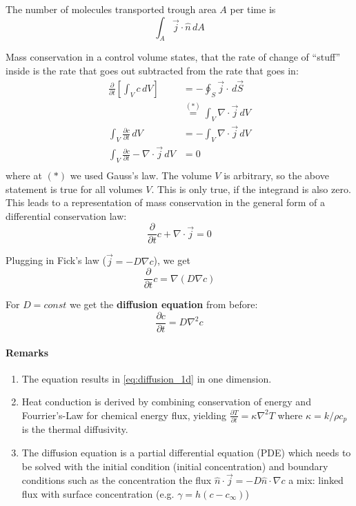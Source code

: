 The number of molecules transported trough area $A$ per time is
\begin{equation*}
	\int_A \vec j \cdot \hat n \, dA
\end{equation*}


Mass conservation in a control volume states, that the rate of change of \enquote{stuff} inside is the rate that goes out subtracted from the rate that goes in:
\begin{equation*}
	\begin{split}
	\frac \partial {\partial t}\left[\int_V c\,dV\right] &= -\oint_S \vec j \cdot \,d\vec S\\
	&\stackrel{(*)}{=} \int_V \nabla \cdot \vec j \,dV\\
	\int_V\frac{\partial c}{\partial t}\,dV &= -\int_V \nabla \cdot \vec j \,dV\\
	\int_V\frac{\partial c}{\partial t}- \nabla \cdot \vec j \,dV &= 0\\
	\end{split}
\end{equation*}
where at $(*)$ we used Gauss's law. The volume $V$ is arbitrary, so the above statement is true for all volumes $V$. This is only true, if the integrand is also zero. This leads to a representation of mass conservation in the general form of a differential conservation law:
\begin{equation*}
	\frac{\partial}{\partial t} c + \nabla \cdot \vec j = 0
\end{equation*}

Plugging in Fick's law ($\vec j = -D\nabla c$), we get
\begin{equation*}
	\frac{\partial}{\partial t}c = \nabla (D\nabla c)
\end{equation*}

For $D=const$ we get the \textbf{diffusion equation} from before:
\begin{equation}
	\boxed{\frac{\partial c}{\partial t} = D \nabla^2 c}
\end{equation}

\paragraph{Remarks}

\begin{enumerate}
	\setlength{\itemsep}{-5pt}
	\item The equation results in \eqref{eq:diffusion_1d} in one dimension.
	\item Heat conduction is derived by combining conservation of energy and Fourrier's-Law for chemical energy flux, yielding $\frac{\partial T}{\partial t} = \kappa \nabla ^2 T$ where $\kappa= k/\rho c_p$ is the thermal diffusivity.
	\item The diffusion equation is a partial differential equation (PDE) which needs to be solved with the initial condition (initial concentration) and boundary conditions such as
	\subitem the concentration
	\subitem the flux  $\hat n \cdot \vec j = -D\hat n  \cdot \nabla c$
	\subitem a mix: linked flux with surface concentration (e.g. $\gamma = h(c-c_\infty)$)
\end{enumerate}
 

